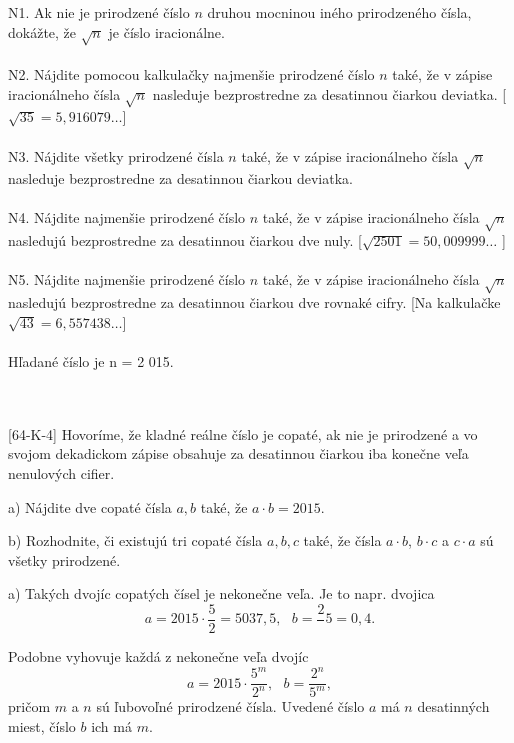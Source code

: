 N1. Ak nie je prirodzené číslo $n$ druhou mocninou iného prirodzeného čísla, dokážte, že $\sqrt{n}$ je číslo iracionálne.\\
\\
N2. Nájdite pomocou kalkulačky najmenšie prirodzené číslo $n$ také, že v zápise iracionálneho čísla $\sqrt{n}$ nasleduje bezprostredne za desatinnou čiarkou deviatka. [$\sqrt{35} = 5,916 079 \ldots$]\\
\\
N3. Nájdite všetky prirodzené čísla $n$ také, že v zápise iracionálneho čísla $\sqrt{n}$ nasleduje bezprostredne za desatinnou čiarkou deviatka.\\
\\
N4. Nájdite najmenšie prirodzené číslo $n$ také, že v zápise iracionálneho čísla $\sqrt{n}$ nasledujú bezprostredne za desatinnou čiarkou dve nuly. [$\sqrt{2 501} = 50,009 999 \ldots$ ]\\
\\
N5. Nájdite najmenšie prirodzené číslo $n$ také, že v zápise iracionálneho čísla $\sqrt{n}$ nasledujú bezprostredne za desatinnou čiarkou dve rovnaké cifry. [Na kalkulačke $\sqrt{43}= 6,557 438\ldots$]\\
\\

Hľadané číslo je n = 2 015.\\
\\
\
\\
\begin{tcolorbox}[breakable,notitle,boxrule=0pt,colback=light-gray,colframe=light-gray]\ul [64-K-4]
Hovoríme, že kladné reálne číslo je copaté, ak nie je prirodzené a vo svojom dekadickom zápise obsahuje za desatinnou čiarkou iba konečne veľa nenulových cifier.

a) Nájdite dve copaté čísla $a, b$ také, že $a \cdot b =2015$.

b) Rozhodnite, či existujú tri copaté čísla $a, b, c$ také, že čísla $a \cdot b$, $b \cdot c$ a $c \cdot a$ sú
všetky prirodzené.

\end{tcolorbox}

\rieh a) Takých dvojíc copatých čísel je nekonečne veľa. Je to napr. dvojica $$a = 2 015 \cdot \frac{5}{2}=5037,5, \ \ \ b =\frac{2}{}5= 0,4.$$

Podobne vyhovuje každá z nekonečne veľa dvojíc
$$a = 2 015 \cdot \frac{5^m}{2^n},\ \ \  b =\frac{2^n}{5^m},$$
pričom $m$ a $n$ sú ľubovoľné prirodzené čísla. Uvedené číslo $a$ má $n$ desatinných miest, číslo $b$ ich má $m$.

